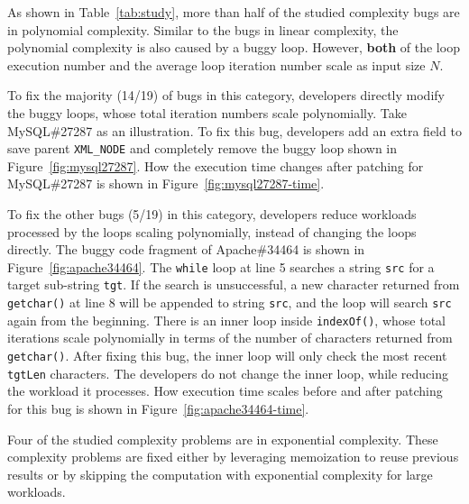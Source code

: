 As shown in Table~\ref{tab:study}, 
more than half of the studied complexity bugs are in polynomial complexity. 
Similar to the bugs in linear complexity,
the polynomial complexity is also caused by a buggy loop.
However, {\bf both} of the loop execution number 
and the average loop iteration number
scale as input size $N$.





To fix the majority (14/19) of bugs in this category,
developers directly modify the buggy loops, 
whose total iteration numbers scale polynomially.
Take MySQL\#27287 as an illustration.
To fix this bug,
developers add an extra field to save parent \texttt{XML\_NODE}
and completely remove the buggy loop shown in Figure~\ref{fig:mysql27287}.
How the execution time changes after patching for MySQL\#27287 is 
shown in Figure~\ref{fig:mysql27287-time}. 

To fix the other bugs (5/19) in this category,
developers reduce workloads processed by the loops scaling polynomially, 
instead of changing the loops directly.
The buggy code fragment of Apache\#34464 is shown in Figure~\ref{fig:apache34464}.
The \texttt{while} loop at line 5 searches a string \texttt{src}
for a target sub-string \texttt{tgt}.
If the search is unsuccessful, 
a new character returned from \texttt{getchar()} at line 8 will be appended 
to string \texttt{src}, 
and the loop will search \texttt{src} again from the beginning. 
There is an inner loop inside \texttt{indexOf()}, whose total iterations 
scale polynomially in terms of the number of characters returned from \texttt{getchar()}. 
After fixing this bug, the inner loop will only check the most recent \texttt{tgtLen} characters.
The developers do not change the inner loop, 
while reducing the workload it processes.   
How execution time scales before and after patching for 
this bug is shown in Figure~\ref{fig:apache34464-time}.




Four of the studied complexity problems are in exponential complexity. 
These complexity problems are fixed 
either by leveraging memoization to reuse previous results 
or by skipping the computation with exponential complexity for large workloads. 



